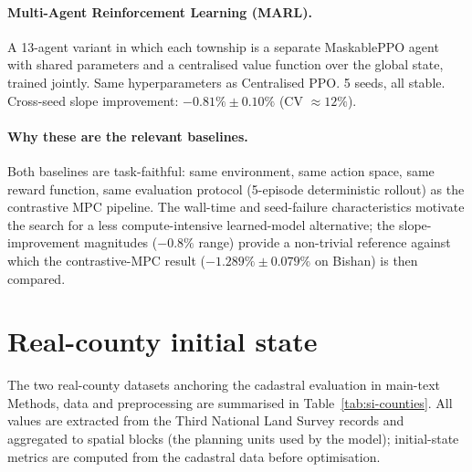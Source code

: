 \documentclass[11pt]{article}
\begin{document}
\paragraph{Multi-Agent Reinforcement Learning (MARL).} A 13-agent variant in which each township is a separate MaskablePPO agent with shared parameters and a centralised value function over the global state, trained jointly. Same hyperparameters as Centralised PPO. 5 seeds, all stable. Cross-seed slope improvement: $-0.81\% \pm 0.10\%$ (CV $\approx 12\%$).

\paragraph{Why these are the relevant baselines.} Both baselines are task-faithful: same environment, same action space, same reward function, same evaluation protocol (5-episode deterministic rollout) as the contrastive MPC pipeline. The wall-time and seed-failure characteristics motivate the search for a less compute-intensive learned-model alternative; the slope-improvement magnitudes ($-0.8\%$ range) provide a non-trivial reference against which the contrastive-MPC result ($-1.289\% \pm 0.079\%$ on Bishan) is then compared.

\section{Real-county initial state}\label{si:counties}

The two real-county datasets anchoring the cadastral evaluation in main-text Methods, data and preprocessing are summarised in Table~\ref{tab:si-counties}. All values are extracted from the Third National Land Survey records and aggregated to spatial blocks (the planning units used by the model); initial-state metrics are computed from the cadastral data before optimisation.
\end{document}
